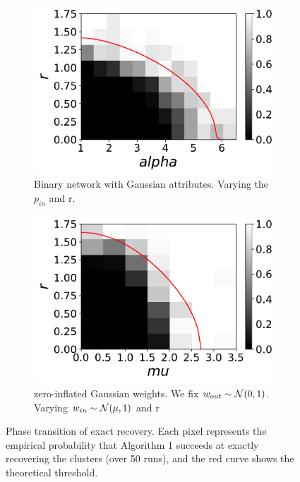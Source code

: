 \documentclass[aspectratio=169]{beamer}
\begin{document}
 \begin{frame}
	     \begin{figure}[!ht]
		  \centering
		   \begin{subfigure}[b]{0.48\textwidth}
			\includegraphics[width=\textwidth]{img/netBernoulli_attGaussian_beta_1_n_500_K_2_nAv_50_table8by10.pdf}
			\caption{Binary network with Gaussian attributes. Varying the $p_{in}$ and r.}
			\label{fig:information_theoretic_threshold_a}
			\end{subfigure}
		\hfill 
		\begin{subfigure}[b]{0.48\textwidth}
		\includegraphics[width=\textwidth]{img/netGaussian0,mu_attGaussian_rho_5_n_600_K_3_nAv_50.pdf}
		\caption{zero-inflated Gaussian weights. We fix $w_{out} \sim \mathcal{N}(0,1)$. Varying $w_{in} \sim \mathcal{N}(\mu,1)$ and r}
		\label{fig:information_theoretic_threshold_b}
		 \end{subfigure}
		 \caption{Phase transition of exact recovery. Each pixel represents the empirical probability that Algorithm 1 succeeds at exactly recovering the clusters (over 50 runs), and the red curve shows the theoretical threshold.
		}
		\label{fig:information_theoretic_threshold}
		 \end{figure}
	\end{frame}
\end{document}
